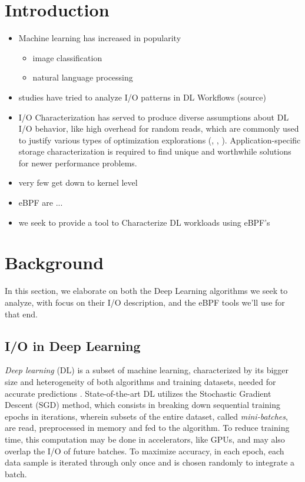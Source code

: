 \documentclass[conference]{IEEEtran}
\begin{document}
\section{Introduction}
\begin{itemize}
    \item Machine learning has increased in popularity
    \begin{itemize}
        \item image classification
        \item natural language processing
    \end{itemize}
    \item studies have tried to analyze I/O patterns in DL Workflows (source)
    \item I/O Characterization has served to produce diverse assumptions about DL I/O behavior, like high overhead for random reads, which are commonly used to justify various types of optimization explorations (\cite{LMDB}, \cite{nvme}, \cite{beegfs}). Application-specific storage characterization is required to find unique and worthwhile solutions for newer performance problems.
    \item very few get down to kernel level
    \item eBPF are ...
    \item we seek to provide a tool to Characterize DL workloads using eBPF's
\end{itemize}

\section{Background}

    In this section, we elaborate on both the Deep Learning algorithms we seek to analyze, with focus on their I/O description, and the eBPF tools we'll use for that end.

    \subsection{I/O in Deep Learning}

    \textit{Deep learning} (DL) is a subset of machine learning, characterized by its bigger size and heterogeneity of both algorithms and training datasets, needed for accurate predictions \cite{gradient}. State-of-the-art DL utilizes the Stochastic Gradient Descent (SGD) method, which consists in breaking down sequential training epochs in iterations, wherein subsets of the entire dataset, called \textit{mini-batches}, are read, preprocessed in memory and fed to the algorithm. To reduce training time, this computation may be done in accelerators, like GPUs, and may also overlap the I/O of future batches. To maximize accuracy, in each epoch, each data sample is iterated through only once and is chosen randomly to integrate a batch. 
    
\end{document}
